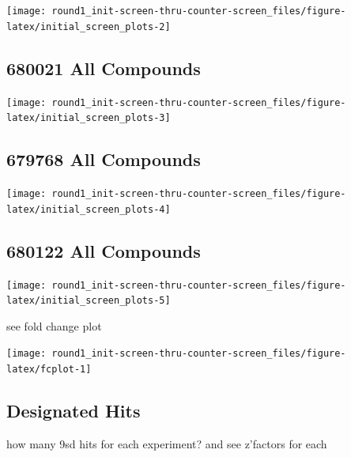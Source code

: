 \documentclass[
]{article}
\begin{document}
\begin{center}\texttt{[image: round1\_init-screen-thru-counter-screen\_files/figure-latex/initial\_screen\_plots-2]} \end{center}

\newpage

\subsection{680021 All Compounds}\label{all-compounds-2}

\begin{center}\texttt{[image: round1\_init-screen-thru-counter-screen\_files/figure-latex/initial\_screen\_plots-3]} \end{center}

\newpage

\subsection{679768 All Compounds}\label{all-compounds-3}

\begin{center}\texttt{[image: round1\_init-screen-thru-counter-screen\_files/figure-latex/initial\_screen\_plots-4]} \end{center}

\newpage

\subsection{680122 All Compounds}\label{all-compounds-4}

\begin{center}\texttt{[image: round1\_init-screen-thru-counter-screen\_files/figure-latex/initial\_screen\_plots-5]} \end{center}

\newpage
\newpage

see fold change plot

\begin{center}\texttt{[image: round1\_init-screen-thru-counter-screen\_files/figure-latex/fcplot-1]} \end{center}

\subsection{Designated Hits}\label{designated-hits}

how many 9sd hits for each experiment? and see z'factors for each
\end{document}
